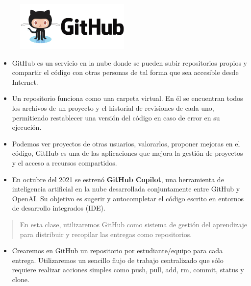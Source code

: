 \documentclass[
  letterpaper,
  DIV=11,
  numbers=noendperiod]{scrreprt}
\providecommand{\tightlist}{%
  \setlength{\itemsep}{0pt}\setlength{\parskip}{0pt}}\usepackage{longtable,booktabs,array}
\begin{document}
\begin{figure}

{\centering \includegraphics[width=0.5\textwidth,height=\textheight]{Figuras/GitHub.png}

}

\end{figure}

\begin{itemize}
\item
  GitHub es un servicio en la nube donde se pueden subir repositorios
  propios y compartir el código con otras personas de tal forma que sea
  accesible desde Internet.
\item
  Un repositorio funciona como una carpeta virtual. En él se encuentran
  todos los archivos de un proyecto y el historial de revisiones de cada
  uno, permitiendo restablecer una versión del código en caso de error
  en su ejecución.
\item
  Podemos ver proyectos de otras usuarios, valorarlos, proponer mejoras
  en el código, GitHub es una de las aplicaciones que mejora la gestión
  de proyectos y el acceso a recursos compartidos.
\item
  En octubre del 2021 se estrenó \textbf{GitHub Copilot}, una
  herramienta de inteligencia artificial en la nube desarrollada
  conjuntamente entre GitHub y OpenAI. Su objetivo es sugerir y
  autocompletar el código escrito en entornos de desarrollo integrados
  (IDE).
\end{itemize}

\begin{quote}
En esta clase, utilizaremos GitHub como sistema de gestión del
aprendizaje para distribuir y recopilar las entregas como repositorios.
\end{quote}

\begin{itemize}
\tightlist
\item
  Crearemos en GitHub un repositorio por estudiante/equipo para cada
  entrega. Utilizaremos un sencillo flujo de trabajo centralizado que
  sólo requiere realizar acciones simples como push, pull, add, rm,
  commit, status y clone.
\end{itemize}
\end{document}
